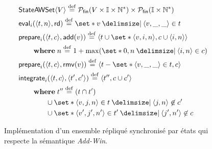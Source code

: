 \begin{figure}[tb]
\centering
\begin{align}
&\trm{StateAWSet}\tuple*{V} \defeq \powerfset{V \times \mathbb{I} \times \mathbb{N}^*} \times \powerfset{\mathbb{I} \times \mathbb{N}^*} \label{eq:state-awset-state}\\
&\trm{eval}_i(\tuple*{t, n}, \trm{rd}) \defeq \set*{v \given \tuple*{v, \_, \_} \in t} \label{eq:state-awset-eval}\\
&\begin{aligned}
\MoveEqLeft\trm{prepare}_i(\tuple*{t, c}, \trm{add}(v)) \defeq \tuple*{t \cup \set*{\tuple*{v, i, n}},c \cup \tuple*{i, n}}\\
    &\where n \defeq 1 + \max(\set*{0,n \given \tuple*{i, n} \in c})
\end{aligned}\label{eq:state-awset-prep-add}\\
&\trm{prepare}_i(\tuple*{t, c}, \trm{rmv}(v)) \defeq \tuple*{t \sminus \set*{\tuple*{v, \_,\_} \in t},c} \label{eq:state-awset-prep-rmv}\\
&\begin{aligned}
\MoveEqLeft \trm{integrate}_i(\tuple*{t, c}, \tuple*{t', c'}) \defeq \tuple*{t'', c \cup c'}\\
    &\begin{aligned}
    \MoveEqLeft\where t'' \defeq (t \cap t')\\
    &\cup \set*{\tuple*{v, j, n} \in t \given \tuple*{j, n} \not\in c'}\\
    &\cup \set*{\tuple*{v', j', n'} \in t' \given \tuple*{j', n'} \not\in c}
    \end{aligned}
\end{aligned}\label{eq:state-awset-integr}
\end{align}
\caption[Implémentation d'un ensemble répliqué synchronisé par états]{Implémentation d'un ensemble répliqué synchronisé par états qui respecte la sémantique \emph{Add-Win}.}\label{fig:state-add-win-set}
\end{figure}

